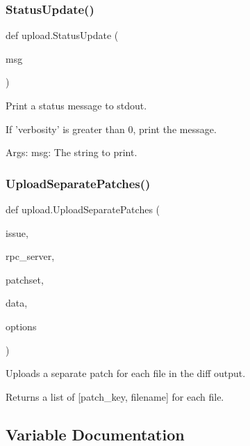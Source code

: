 \subsubsection{\texorpdfstring{Status\+Update()}{StatusUpdate()}}
{\footnotesize\ttfamily def upload.\+Status\+Update (\begin{DoxyParamCaption}\item[{}]{msg }\end{DoxyParamCaption})}

\begin{DoxyVerb}Print a status message to stdout.

If 'verbosity' is greater than 0, print the message.

Args:
  msg: The string to print.
\end{DoxyVerb}
 \mbox{\label{namespaceupload_a7ec83cb7f7bfb9109c19b6f91552b3ee}} 
\subsubsection{\texorpdfstring{Upload\+Separate\+Patches()}{UploadSeparatePatches()}}
{\footnotesize\ttfamily def upload.\+Upload\+Separate\+Patches (\begin{DoxyParamCaption}\item[{}]{issue,  }\item[{}]{rpc\+\_\+server,  }\item[{}]{patchset,  }\item[{}]{data,  }\item[{}]{options }\end{DoxyParamCaption})}

\begin{DoxyVerb}Uploads a separate patch for each file in the diff output.

Returns a list of [patch_key, filename] for each file.
\end{DoxyVerb}
 

\subsection{Variable Documentation}
\mbox{\label{namespaceupload_a675d13c979f1c720866d22ed1736f580}} 
